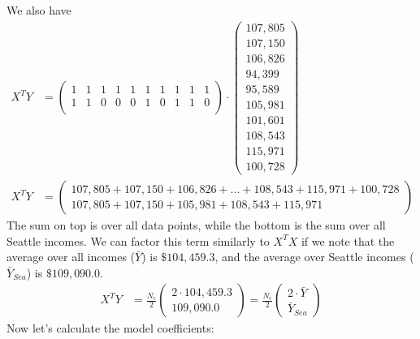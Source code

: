 We also have
\begin{align}
X^T Y &= 
\left(\begin{array}{cccccccccc}
         1 & 1 & 1 & 1 & 1 & 1 & 1 & 1 & 1 & 1 \\
         1 & 1 & 0 & 0 & 0 & 1 & 0 & 1 & 1 & 0 \\
\end{array}\right)
\cdot
\left(\begin{array}{c}
         107,805 \\ 
         107,150 \\ 
         106,826 \\ 
          94,399 \\ 
          95,589 \\ 
         105,981 \\ 
         101,601 \\ 
         108,543 \\ 
         115,971 \\ 
         100,728 
\end{array}\right)
\\
X^T Y &= 
\left(\begin{array}{c}
         107,805 + 107,150 + 106,826 + ... + 108,543 + 115,971 + 100,728 \\
         107,805 + 107,150 + 105,981 + 108,543 + 115,971 
\end{array}\right)
\end{align}
The sum on top is over all data points, while the bottom is the sum over all
Seattle incomes.
We can factor this term similarly to $X^T X$ if we note that the average
over all incomes ($\bar{Y}$) is $\$104,459.3$, and the average over Seattle
incomes ($\bar{Y}_{Sea}$) is
$\$109,090.0$.
\begin{align}
X^T Y &= \frac{N_e}{2} 
\left(\begin{array}{c}
         2 \cdot 104,459.3 \\
         109,090.0 
\end{array}\right)
= \frac{N_e}{2} 
\left(\begin{array}{c}
         2 \cdot \bar{Y} \\
          \bar{Y}_\mathit{Sea} 
\end{array}\right)
\end{align}
Now let's calculate the model coefficients:
